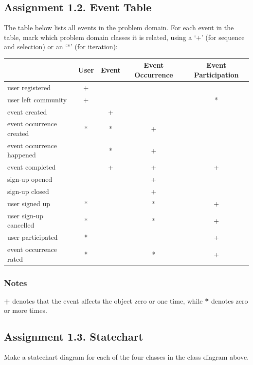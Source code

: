 \subsection{Assignment 1.2. Event Table}
The table below lists all events in the problem domain. For each event in the table, mark which problem domain classes it is related, using a ‘+’ (for sequence and selection) or an ‘*’ (for iteration): 
\begin{center}
    \begin{tabular}{|l|c|c|c|c|}
    \hline
         & User & Event & Event Occurrence & Event Participation \\ \hline
        user registered & + & & &  \\ \hline
        user left community & + & & & *  \\ \hline
        event created & & + & &  \\ \hline
        event occurrence created & * & * & + &  \\ \hline
        event occurrence happened & & * & + &  \\ \hline
        event completed & & + & + & +  \\ \hline
        sign-up opened & & & + &  \\ \hline
        sign-up closed & & & + &  \\ \hline
        user signed up & * & & * & +  \\ \hline
        user sign-up cancelled & * & & * & + \\ \hline
        user participated & * & & & + \\ \hline
        event occurrence rated & * & & * & + \\ \hline
    \end{tabular}
\end{center}
\subsubsection*{Notes}
\textbf{+} denotes that the event affects the object zero or one time, while \textbf{*} denotes zero or more times.

\subsection{Assignment 1.3. Statechart}
Make a statechart diagram for each of the four classes in the class diagram above.

